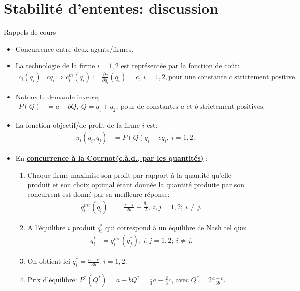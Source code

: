 \section{Stabilité d'ententes: discussion}
\frame {\sectionpage}
\begin{frame}[allowframebreaks]{Rappels de cours}
\begin{itemize}
    \item Concurrence entre deux agents/firmes.
    \item La technologie de la firme $i = 1, 2$ est représentée par la fonction de coût:
    \begin{align*}
        c_i(q_i) & c q_i \Rightarrow  c^m_i(q_i) :=\frac{\partial c}{\partial q_i}(q_i) = c,  \ i = 1, 2, \text{pour une constante $c$ strictement positive}.\  
    \end{align*}
    \item Notons la demande inverse,
    \begin{align*}
        P(Q) &= a - b Q, \ Q = q_1+q_2, \ \text{pour de constantes $a$ et $b$ strictement positives}.
    \end{align*}
    \item La fonction objectif/de profit de la firme $i$ est:
    \begin{align*}
        \pi_i(q_i, q_j) &=P(Q)q_i - c q_i, \ i=1, 2.
    \end{align*}
    \framebreak 
    \item En \textbf{\underline{concurrence à la Cournot(c.à.d., par les quantités)}} :
    \begin{enumerate}[-]
        \item Chaque firme maximise son profit par rapport à la quantité qu'elle produit et son choix optimal étant donnée 
        la quantité produite par son concurrent est donné par sa meilleure réponse:
        \begin{align*}
            q_i^{mr}(q_j) &=\frac{a-c}{2b} - \frac{q_j}{2}, \ i, j = 1, 2; \ i\neq j.
        \end{align*}
        \item A l'équilibre $i$ produit $q_i^*$ qui correspond à un équilibre  de Nash tel que:
        \begin{align*}
            q_i^* &=q_i^{mr}(q_j^*), \  i, j = 1, 2; \ i\neq j.
        \end{align*}
        \item On obtient ici $q_i^* = \frac{a-c}{3b}$, $i = 1, 2$.
        \item Prix d'équilibre: $P^*(Q^*) = a - b Q^* = \frac{1}{3}a - \frac{2}{3}c$, avec $Q^* = 2 \frac{a-c}{3b}$.

\end{enumerate}
\end{itemize}
\end{frame}
